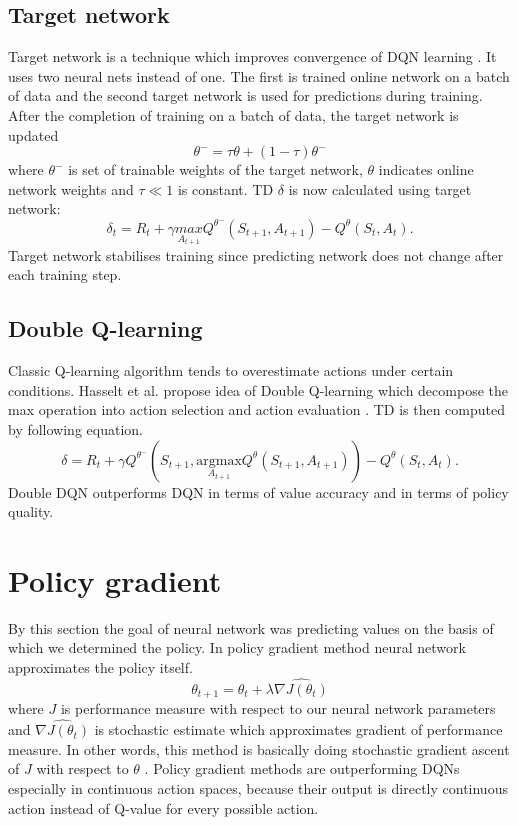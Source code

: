 \subsection{Target network}
Target network is a technique which improves convergence of DQN learning \cite{mnih2015}. It uses two neural nets instead of one. The first is trained online network on a batch of data and the second target network is used for predictions during training. After the completion of training on a batch of data, the target network is updated
\begin{equation}
\theta^- = \tau \theta + (1-\tau)\theta^-
\end{equation}
where $\theta^-$ is set of trainable weights of the target network, $\theta$ indicates online network weights and $\tau \ll 1$ is constant.
TD $\delta$ is now calculated using target network:
\begin{equation}
\delta_t = R_{t} + \gamma \underset{A_{t+1}}{max}Q^{\theta^-}(S_{t+1}, A_{t+1}) - Q^\theta(S_t, A_t). 
\end{equation}
Target network stabilises training since predicting network does not change after each training step.

\subsection{Double Q-learning}
Classic Q-learning algorithm tends to overestimate actions under certain conditions. Hasselt et al. propose idea of Double Q-learning which decompose the max operation into action selection and action evaluation \cite{hasselt2015}. TD is then computed by following equation.
\begin{equation}
\delta = R_{t} + \gamma Q^{\theta^-}(S_{t+1}, \underset{A_{t+1}}{\text{argmax}}Q^\theta(S_{t+1}, A_{t+1})) - Q^\theta (S_t, A_t).
\end{equation}
Double DQN outperforms DQN in terms of value accuracy and in terms of policy quality.

\clearpage
\section{Policy gradient}
By this section the goal of neural network was predicting values on the basis of which we determined the policy. In policy gradient method neural network approximates the policy itself. 
\begin{equation}
\theta_{t+1} = \theta_t + \lambda \widehat{\nabla J(\theta_t)}
\end{equation}
where $J$ is performance measure with respect to our neural network parameters and $\widehat{\nabla J(\theta_t)}$ is stochastic estimate which approximates gradient of performance measure. In other words, this method is basically doing stochastic gradient ascent of $J$ with respect to $\theta$ \cite{sutton1999}. Policy gradient methods are outperforming DQNs especially in continuous action spaces, because their output is directly continuous action instead of Q-value for every possible action.

